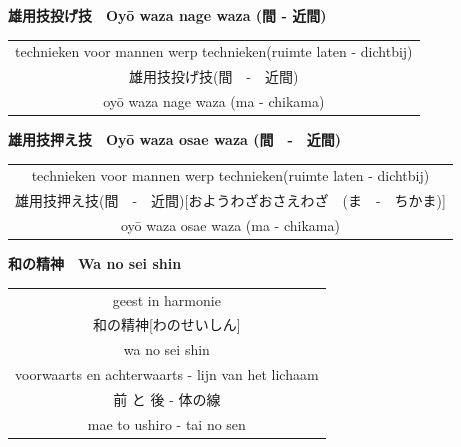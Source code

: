 \documentclass[a4paper, 12pt]{article}
\begin{document}
\begin{CJK}{UTF8}{min}
\newpage
\begin{center}
    \textbf{雄用技投げ技　Oy\={o} waza nage waza (間 - 近間)}
\end{center}
\begin{table}[H]
\begin{center}
\begin{tabular}{c}
technieken voor mannen werp technieken(ruimte laten - dichtbij)\\
雄用技投げ技(間　-　近間)\\
oy\={o} waza nage waza (ma - chikama)\\
\end{tabular}
\end{center}
\label{oyouwazanagewaza}
\end{table}

\begin{center}
    \textbf{雄用技押え技　Oy\={o} waza osae waza (間　-　近間)}
\end{center}
\begin{table}[H]
\begin{center}
\begin{tabular}{c}
technieken voor mannen werp technieken(ruimte laten - dichtbij)\\
雄用技押え技(間　-　近間)[おようわざおさえわざ　(ま　-　ちかま)]\\
oy\={o} waza osae waza (ma - chikama)\\
\end{tabular}
\end{center}
\label{oyouwazaosaewaza}
\end{table}

\begin{center}
    \textbf{和の精神　Wa no sei shin}
\end{center}
\begin{table}[H]
\begin{center}
\begin{tabular}{c}
geest in harmonie\\
和の精神[わのせいしん]\\
wa no sei shin\\
\hline
voorwaarts en achterwaarts - lijn van het lichaam\\
前 と 後 - 体の線\\
mae to ushiro - tai no sen
\end{tabular}
\end{center}
\label{wanoseishin}
\end{table}


\end{CJK}
\end{document}
